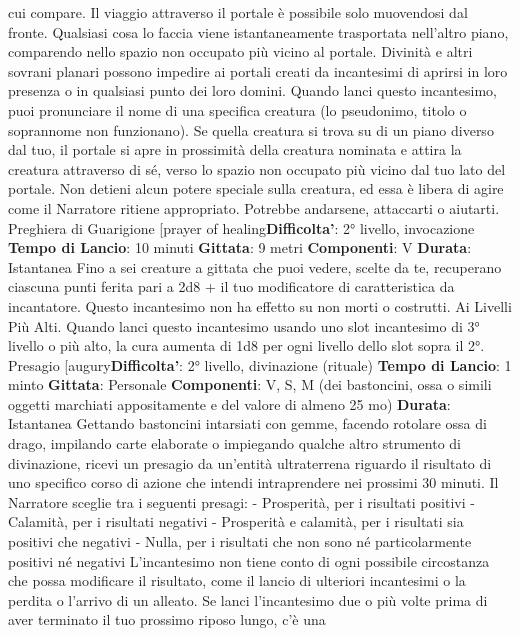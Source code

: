 \begin{multicols}{2}
cui compare. Il viaggio attraverso il portale è possibile
solo muovendosi dal fronte. Qualsiasi cosa lo faccia
viene istantaneamente trasportata nell’altro piano,
comparendo nello spazio non occupato più vicino al
portale.
Divinità e altri sovrani planari possono impedire ai
portali creati da incantesimi di aprirsi in loro presenza o
in qualsiasi punto dei loro domini.
Quando lanci questo incantesimo, puoi pronunciare il
nome di una specifica creatura (lo pseudonimo, titolo o
soprannome non funzionano). Se quella creatura si
trova su di un piano diverso dal tuo, il portale si apre in
prossimità della creatura nominata e attira la creatura
attraverso di sé, verso lo spazio non occupato più vicino
dal tuo lato del portale. Non detieni alcun potere
speciale sulla creatura, ed essa è libera di agire come il
Narratore ritiene appropriato. Potrebbe andarsene, attaccarti
o aiutarti.
Preghiera di Guarigione
[prayer of healing\textbf{Difficolta'}:
2° livello, invocazione
\textbf{Tempo di Lancio}: 10 minuti
\textbf{Gittata}: 9 metri
\textbf{Componenti}: V
\textbf{Durata}: Istantanea
Fino a sei creature a gittata che puoi vedere, scelte da
te, recuperano ciascuna punti ferita pari a 2d8 + il tuo
modificatore di caratteristica da incantatore. Questo
incantesimo non ha effetto su non morti o costrutti.
Ai Livelli Più Alti. Quando lanci questo incantesimo
usando uno slot incantesimo di 3° livello o più alto, la
cura aumenta di 1d8 per ogni livello dello slot sopra il
2°.
Presagio
[augury\textbf{Difficolta'}:
2° livello, divinazione (rituale)
\textbf{Tempo di Lancio}: 1 minto
\textbf{Gittata}: Personale
\textbf{Componenti}: V, S, M (dei bastoncini, ossa o simili
oggetti marchiati appositamente e del valore di almeno
25 mo)
\textbf{Durata}: Istantanea
Gettando bastoncini intarsiati con gemme, facendo
rotolare ossa di drago, impilando carte elaborate o
impiegando qualche altro strumento di divinazione,
ricevi un presagio da un’entità ultraterrena riguardo il
risultato di uno specifico corso di azione che intendi
intraprendere nei prossimi 30 minuti. Il Narratore sceglie tra i
seguenti presagi:
- Prosperità, per i risultati positivi
- Calamità, per i risultati negativi
- Prosperità e calamità, per i risultati sia positivi che
negativi
- Nulla, per i risultati che non sono né particolarmente
positivi né negativi
L’incantesimo non tiene conto di ogni possibile
circostanza che possa modificare il risultato, come il
lancio di ulteriori incantesimi o la perdita o l’arrivo di un
alleato.
Se lanci l’incantesimo due o più volte prima di aver
terminato il tuo prossimo riposo lungo, c’è una

\end{multicols}
